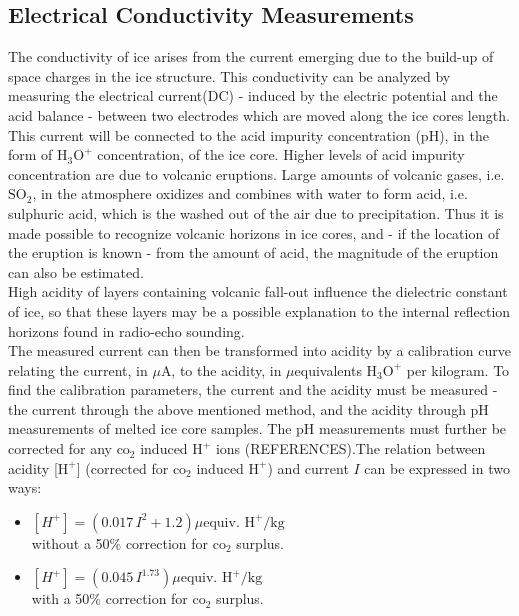 \documentclass[../../CompleteThesis/Complete_1stDraft.tex]{subfiles}
\begin{document}
\subsection[ECM][ECM]{Electrical Conductivity Measurements}
\label{Sec:Ice_ECMandDEP_ECM}
The conductivity of ice arises from the current emerging due to the build-up of space charges in the ice structure. This conductivity can be analyzed by measuring the electrical current(DC) - induced by the electric potential and the acid balance - between two electrodes which are moved along the ice cores length. This current will be connected to the acid impurity concentration (pH), in the form of $\text{H}_3\text{O}^+$ concentration, of the ice core. Higher levels of acid impurity concentration are due to volcanic eruptions. Large amounts of volcanic gases, i.e. $\text{SO}_2$, in the atmosphere oxidizes and combines with water to form acid, i.e. sulphuric acid, which is the washed out of the air due to precipitation. Thus it is made possible to recognize volcanic horizons in ice cores, and - if the location of the eruption is known - from the amount of acid, the magnitude of the eruption can also be estimated.\\
High acidity of layers containing volcanic fall-out influence the dielectric constant of ice, so that these layers may be a possible explanation to the internal reflection horizons found in radio-echo sounding. \\
The measured current can then be transformed into acidity by a calibration curve relating the current, in $\mu$A, to the acidity, in $\mu$equivalents $\text{H}_3\text{O}^+$ per kilogram. To find the calibration parameters, the current and the acidity must be measured - the current through the above mentioned method, and the acidity through pH measurements of melted ice core samples. The pH measurements must further be corrected for any $\text{co}_2$ induced $\text{H}^+$ ions (REFERENCES).The relation between acidity [$\text{H}^+$] (corrected for $\text{co}_2$ induced $\text{H}^+$) and current $I$ can be expressed in two ways:
\begin{itemize}
	\item $[H^+] = (0.017\, I^2 + 1.2) \mu \text{equiv. H}^+ /\text{kg}$\\
	without a 50\% correction for $\text{co}_2$ surplus.
	\item $[H^+] = (0.045\, I^{1.73}) \mu \text{equiv. H}^+ /\text{kg}$\\
	with a 50\% correction for $\text{co}_2$ surplus.
\end{itemize}
\end{document}
